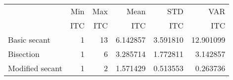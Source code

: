\begin{tabular}{lrrrrr}
\toprule
{} &              Min &              Max &              Mean &               STD &               VAR \\
{} & ITC & ITC & ITC & ITC & ITC \\
\midrule
Basic secant    &                 1 &                13 &          6.142857 &          3.591810 &         12.901099 \\
Bisection       &                 1 &                 6 &          3.285714 &          1.772811 &          3.142857 \\
Modified secant &                 1 &                 2 &          1.571429 &          0.513553 &          0.263736 \\
\bottomrule
\end{tabular}
